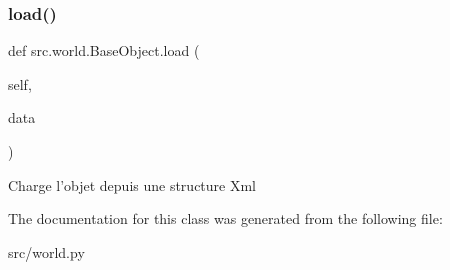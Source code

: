 \subsubsection{\texorpdfstring{load()}{load()}}
{\footnotesize\ttfamily def src.\+world.\+Base\+Object.\+load (\begin{DoxyParamCaption}\item[{}]{self,  }\item[{}]{data }\end{DoxyParamCaption})}

\begin{DoxyVerb}Charge l'objet depuis une structure Xml \end{DoxyVerb}
 

The documentation for this class was generated from the following file\+:\begin{DoxyCompactItemize}
\item 
src/world.\+py\end{DoxyCompactItemize}
